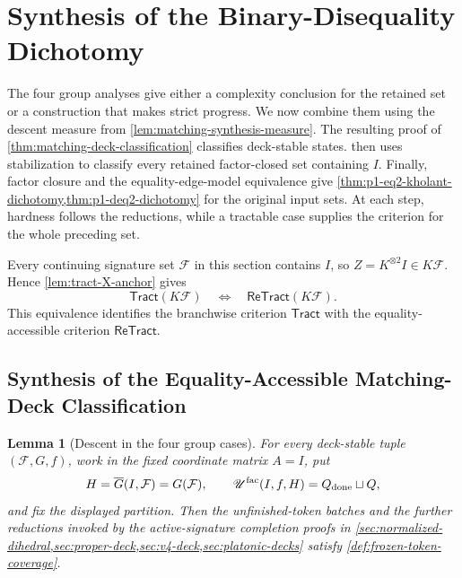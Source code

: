 \documentclass[11pt,letterpaper,onecolumn]{article}
\theoremstyle{plain}
\newtheorem{lemma}[lemma]{Lemma}
\theoremstyle{definition}
\theoremstyle{remark}
\newcommand{\cF}{\mathcal F}
\newcommand{\Tract}{\mathsf{Tract}}
\newcommand{\ReTract}{\mathsf{ReTract}}
\begin{document}
\section{Synthesis of the Binary-Disequality Dichotomy}
\label{sec:p1-synthesis}

The four group analyses give either a complexity conclusion for the
retained set or a construction that makes strict progress. We now combine
them using the descent measure from \cref{lem:matching-synthesis-measure}.
The resulting proof of \cref{thm:matching-deck-classification} classifies
deck-stable states.  then uses
stabilization to classify every retained factor-closed set containing \(I\).
Finally, factor closure and the equality-edge-model equivalence give
\cref{thm:p1-eq2-kholant-dichotomy,thm:p1-deq2-dichotomy} for the original
input sets. At each step, hardness follows the reductions, while a
tractable case supplies the criterion for the whole preceding set.

Every continuing signature set \(\cF\) in this section contains \(I\),
so \(Z=K^{\otimes2}I\in K\cF\).  Hence
\cref{lem:tract-X-anchor} gives
\[
  \Tract(K\cF)\quad\Longleftrightarrow\quad
  \ReTract(K\cF).
\]
This equivalence identifies the branchwise criterion \(\Tract\) with the
equality-accessible criterion \(\ReTract\).

\subsection{Synthesis of the Equality-Accessible Matching-Deck Classification}
\label{proofsec:matching-deck-synthesis}

\begin{lemma}[Descent in the four group cases]
\label{lem:token-coverage}
For every deck-stable tuple \((\cF,G,f)\), work in the fixed coordinate matrix \(A=I\), put
\[
 H=\overline G(I,\cF)=G(\cF),
 \qquad
 \mathscr U^{\mathrm{fac}}(I,f,H)=Q_{\rm done}\sqcup Q,
\]
and fix the displayed partition.  Then the unfinished-token batches and
the further reductions invoked by the active-signature completion proofs in
\cref{sec:normalized-dihedral,sec:proper-deck,sec:v4-deck,sec:platonic-decks}
satisfy \cref{def:frozen-token-coverage}.
\end{lemma}
\end{document}
